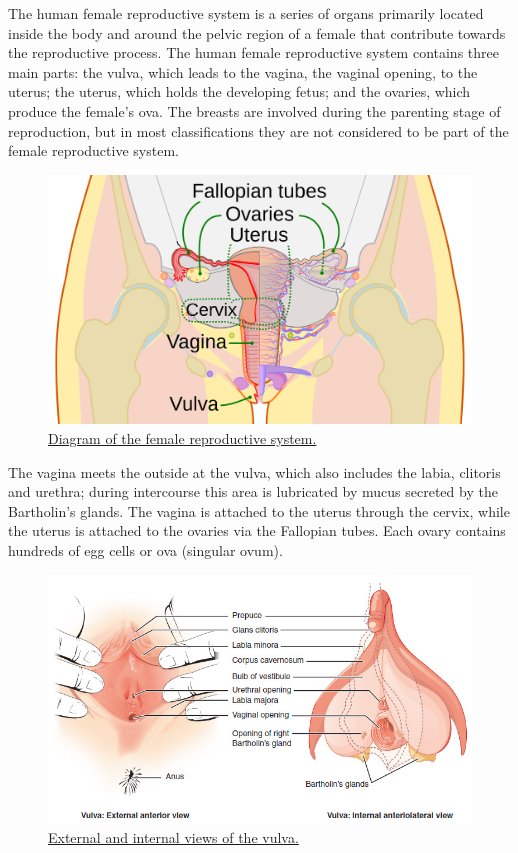 The human female reproductive system is a series of organs primarily located inside the body and around the pelvic region of a female that contribute towards the reproductive process. The human female reproductive system contains three main parts: the vulva, which leads to the vagina, the vaginal opening, to the uterus; the uterus, which holds the developing fetus; and the ovaries, which produce the female's ova. The breasts are involved during the parenting stage of reproduction, but in most classifications they are not considered to be part of the female reproductive system.



\begin{figure}

{\centering \includegraphics[width=0.7\linewidth]{./figures/reproductive_system/Scheme_female_reproductive_system-en} 

}

\caption{\href{https://commons.wikimedia.org/wiki/File:Female_anatomy_en.svg}{Diagram of the female reproductive system.}}\label{fig:femalereproductivesystem}
\end{figure}

The vagina meets the outside at the vulva, which also includes the labia, clitoris and urethra; during intercourse this area is lubricated by mucus secreted by the Bartholin's glands. The vagina is attached to the uterus through the cervix, while the uterus is attached to the ovaries via the Fallopian tubes. Each ovary contains hundreds of egg cells or ova (singular ovum).



\begin{figure}

{\centering \includegraphics[width=0.7\linewidth]{./figures/reproductive_system/Figure_28_02_02} 

}

\caption{\href{https://commons.wikimedia.org/wiki/File:Figure_28_02_02.jpg}{External and internal views of the vulva.}}\label{fig:vulvaview}
\end{figure}

